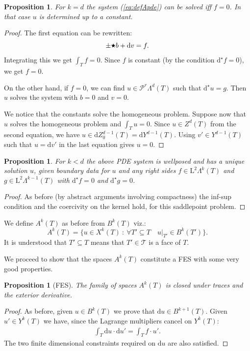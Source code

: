 \documentclass[10pt,a4paper]{article}
\newcommand{\rmd}{\mathrm{d}}
\newcommand{\rmL}{\mathrm{L}}
\newcommand{\calP}{\mathcal{P}}
\newcommand{\calT}{\mathcal{T}}
\newcommand{\hs}{\raisebox{1pt}{$\scriptstyle \bigstar$}}
\newcommand{\Poly}{\calP}
\newtheorem{proposition}[theorem]{Proposition}
\theoremstyle{remark}
\theoremstyle{definition}
\numberwithin{equation}{section}
\begin{document}
 \begin{proposition}
   For $k= d$ the system (\ref{eq:defApde}) can be solved iff $f = 0$. In that case $u$ is determined up to a constant.
 \end{proposition}
 \begin{proof}
The first equation can be rewritten:
 \begin{equation}
   \pm \hs b + \rmd v = f.
 \end{equation}
 Integrating this we get $\int_T f =0$. Since $f$ is constant (by the condition $\rmd^\star f =0$), we get $f = 0$.

 On the other hand, if $f =0$, we can find $u \in \Poly^r \Lambda^d(T)$ such that $\rmd^\star u = g$. Then $u$ solves the system with $b= 0$ and $v = 0$.

 We notice that the constants solve the homogeneous problem. Suppose now that $u$ solves the homogeneous problem and $\int_T u  =0$. Since $u \in Z^d(T)$ from the second equation, we have $u \in \rmd Z^{d-1}_0(T) = \rmd Y^{d-1}(T)$. Using $v' \in Y^{d-1}(T)$ such that $u = \rmd v'$ in the last equation gives $u= 0$.
 \end{proof}
 
\begin{proposition}\label{prop:pdeext}
For $k < d$  the above PDE system is wellposed and has a unique solution $u$, given boundary data for $u$ and any right sides $f\in \rmL^2 \Lambda^k(T)$ and $g \in \rmL^2 \Lambda^{k-1}(T)$ with $\rmd^\star f = 0$ and $\rmd^\star g = 0$.
\end{proposition}
\begin{proof}
  As before (by abstract arguments involving compactness) the inf-sup condition and the coercivity on the kernel hold, for this saddlepoint problem.
\end{proof}

We define $A^k(T)$ as before from $B^k(T)$ viz.:
\begin{equation}
  A^k(T) = \{u \in X^k(T) \ : \ \forall T' \subseteq T \quad u|_{T'} \in B^k(T') \}.
\end{equation}
It is understood that $T' \subseteq T$ means that $T' \in \calT$ is a face of $T$.


We proceed to show that the spaces $A^k(T)$ constitute a FES with some very good properties.

\begin{proposition}[FES]\label{prop:highclosed}
The family of spaces $A^k(T)$ is closed under traces and the exterior derivative.
\end{proposition}
\begin{proof}
  As before, given $u \in B^k(T)$ we prove that $\rmd u \in B^{k+1}(T)$. Given $u'\in Y^k(T)$ we have, since the Lagrange multipliers cancel on $Y^k(T)$:
  \begin{align}
    \int_T \rmd u \cdot \rmd u' = \int_T f \cdot u'.
  \end{align}
  The two finite dimensional constraints required on $\rmd u$ are also satisfied.
\end{proof}
\end{document}
